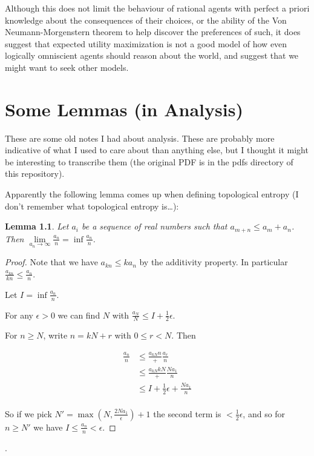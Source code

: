 \documentclass[a4paper]{book}
\newtheorem{lemma}{Lemma}[section]
\begin{document}
Although this does not limit the behaviour of rational agents with perfect
a priori knowledge about the consequences of their choices, or the ability of
the Von Neumann-Morgenstern theorem to help discover the preferences of such,
it does suggest that expected utility maximization is not a good model of how
even logically omniscient agents should reason about the world, and suggest
that we might want to seek other models.

\chapter{Some Lemmas (in Analysis)}

These are some old notes I had about analysis.
These are probably more indicative of what I used to care about than anything else,
but I thought it might be interesting to transcribe them (the original PDF is in the pdfs directory of this repository).

Apparently the following lemma comes up when defining topological entropy (I don't remember what topological entropy is\ldots):

\begin{lemma}
Let \(a_i\) be a sequence of real numbers such that \(a_{m + n} \leq a_m + a_n\).
Then \(\lim\limits_{a_n \to \infty} \frac{a_n}{n} = \inf \frac{a_n}{n}\).
\end{lemma}

\begin{proof}
Note that we have \(a_{kn} \leq k a_n\) by the additivity property.
In particular \(\frac{a_{kn}}{kn} \leq \frac{a_n}{n}\).

Let \(I = \inf \frac{a_n}{n}\).

For any \(\epsilon > 0\) we can find \(N\) with \(\frac{a_N}{N} \leq I + \frac{1}{2}\epsilon\).

For \(n \geq N\), write \(n = kN + r\) with \(0 \leq r < N\).
Then

\begin{align*}
\frac{a_n}{n} &\leq \frac{a_{kN}{n}} + \frac{a_r}{n}\\
&\leq \frac{a_{kN}{kN}} + \frac{N a_1}{n}\\
&\leq I + \frac{1}{2} \epsilon + \frac{N a_1}{n}\\
\end{align*}

So if we pick \(N' = \max(N, \frac{2 N a_1}{\epsilon}) + 1\) the second term is \(< \frac{1}{2}\epsilon\),
and so for \(n \geq N'\) we have \(I \leq \frac{a_n}{n} < \epsilon\).
\end{proof}.
\end{document}
